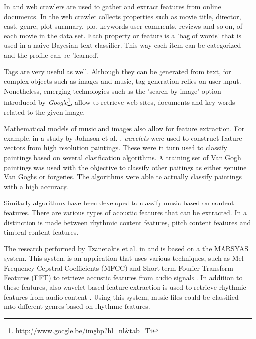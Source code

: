 In \cite{bostandjiev:2012} and \cite{melville:2002:CCF:777092.777124} web crawlers are used to gather and extract features from online documents. In \cite{melville:2002:CCF:777092.777124} the web crawler collects properties such as movie title, director, cast, genre, plot summary, plot keywords user comments, reviews and so on, of each movie in the data set. Each property or feature is a 'bag of words' that is used in a naive Bayesian text classifier. This way each item can be categorized and the profile can be 'learned'\cite{melville:2002:CCF:777092.777124}.

Tags are very useful as well. Although they can be generated from text, for complex objects such as images and music, tag generation relies on user input\cite{rajaraman:2012}. Nonetheless, emerging technologies such as the 'search by image' option introduced by \emph{Google}\footnote{\url{http://www.google.be/imghp?hl=nl&tab=Ti}}, allow to retrieve web sites, documents and key words related to the given image\cite{google:2011:afbeeldingen}.

Mathematical models of music and images also allow for feature extraction. For example, in a study by Johnson et al. \cite{johnson:2008}, \emph{wavelets} were used to construct feature vectors from high resolution paintings. These were in turn used to classify paintings based on several clasification algorithms. A training set of Van Gogh paintings was used with the objective to classify other paitings as either genuine Van Goghs or forgeries. The algorithms were able to actually classify paintings with a high accuracy\cite{johnson:2008}.

Similarly algorithms have been developed to classify music based on content features. There are various types of acoustic features that can be extracted. In \cite{Li:2006:TIM:2219090.2219562} a distinction is made between rhythmic content features, pitch content features and timbral content features.

The research performed by Tzanetakis et al. in \cite{tzanetakis:2001} and \cite{tzanetakis:2002} is based on a the MARSYAS system. This system is an application that uses various techniques, such as Mel-Frequency Cepstral Coefficients (MFCC) and Short-term Fourier Transform Features (FFT) to retrieve acoustic features from audio signals \cite{Tzanetakis:1999:MFA:972850.972857}. In addition to these features, also wavelet-based feature extraction is used to retrieve rhythmic features from audio content \cite{tzanetakis:2001, tzanetakis:2002}. Using this system, music files could be classified into different genres based on rhythmic features\cite{tzanetakis:2001}.

